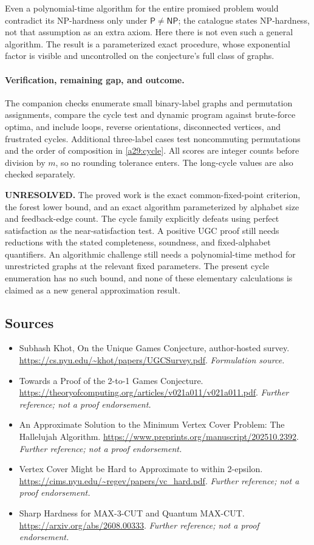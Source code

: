 \documentclass[11pt]{article}
\begin{document}
Even a polynomial-time algorithm for the entire promised problem would
contradict its NP-hardness only under $\mathsf P\ne\mathsf{NP}$; the
catalogue states NP-hardness, not that assumption as an extra axiom.
Here there is not even such a general algorithm. The result is a parameterized
exact procedure, whose exponential factor is visible and uncontrolled on
the conjecture's full class of graphs.

\paragraph{Verification, remaining gap, and outcome.}
The companion checks enumerate small binary-label graphs and permutation
assignments, compare the cycle test and dynamic program against brute-force
optima, and include loops, reverse orientations, disconnected vertices,
and frustrated cycles. Additional three-label cases test noncommuting
permutations and the order of composition in \eqref{a29:cycle}. All scores
are integer counts before division by $m$, so no rounding tolerance enters.
The long-cycle values are also checked separately.

\textbf{UNRESOLVED.} The proved work is the exact common-fixed-point
criterion, the forest lower bound, and an exact algorithm parameterized by
alphabet size and feedback-edge count. The cycle family explicitly defeats
using perfect satisfaction as the near-satisfaction test. A positive UGC
proof still needs reductions with the stated completeness, soundness, and
fixed-alphabet quantifiers. An algorithmic challenge still needs a
polynomial-time method for unrestricted graphs at the relevant fixed
parameters. The present cycle enumeration has no such bound, and none of
these elementary calculations is claimed as a new general approximation
result.

\subsection{Sources}
\begin{itemize}
\item[S1]Subhash Khot, On the Unique Games Conjecture, author-hosted survey.
\url{https://cs.nyu.edu/~khot/papers/UGCSurvey.pdf}.
\textit{Formulation source.}
\item[S2]Towards a Proof of the 2-to-1 Games Conjecture.
\url{https://theoryofcomputing.org/articles/v021a011/v021a011.pdf}.
\textit{Further reference; not a proof endorsement.}
\item[S3]An Approximate Solution to the Minimum Vertex Cover Problem: The Hallelujah Algorithm.
\url{https://www.preprints.org/manuscript/202510.2392}.
\textit{Further reference; not a proof endorsement.}
\item[S4]Vertex Cover Might be Hard to Approximate to within 2-epsilon.
\url{https://cims.nyu.edu/~regev/papers/vc_hard.pdf}.
\textit{Further reference; not a proof endorsement.}
\item[S5]Sharp Hardness for MAX-3-CUT and Quantum MAX-CUT.
\url{https://arxiv.org/abs/2608.00333}.
\textit{Further reference; not a proof endorsement.}
\end{itemize}
\end{document}
